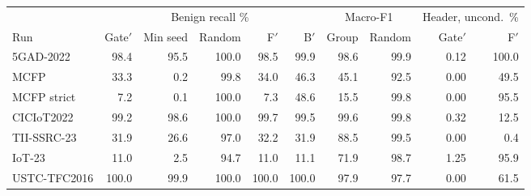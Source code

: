 \begin{tabular}{lrrrrrrrrr}
\toprule
& \multicolumn{5}{c}{Benign recall \%} & \multicolumn{2}{c}{Macro-F1} & \multicolumn{2}{c}{Header, uncond.\ \%} \\ \cmidrule(lr){2-6}\cmidrule(lr){7-8}\cmidrule(lr){9-10}
Run & Gate$'$ & Min seed & Random & F$'$ & B$'$ & Group & Random & Gate$'$ & F$'$ \\
\midrule
5GAD-2022 & 98.4 & 95.5 & 100.0 & 98.5 & 99.9 & 98.6 & 99.9 & 0.12 & 100.0 \\
MCFP & 33.3 & 0.2 & 99.8 & 34.0 & 46.3 & 45.1 & 92.5 & 0.00 & 49.5 \\
MCFP strict & 7.2 & 0.1 & 100.0 & 7.3 & 48.6 & 15.5 & 99.8 & 0.00 & 95.5 \\
CICIoT2022 & 99.2 & 98.6 & 100.0 & 99.7 & 99.5 & 99.6 & 99.8 & 0.32 & 12.5 \\
TII-SSRC-23 & 31.9 & 26.6 & 97.0 & 32.2 & 31.9 & 88.5 & 99.5 & 0.00 & 0.4 \\
IoT-23 & 11.0 & 2.5 & 94.7 & 11.0 & 11.1 & 71.9 & 98.7 & 1.25 & 95.9 \\
USTC-TFC2016 & 100.0 & 99.9 & 100.0 & 100.0 & 100.0 & 97.9 & 97.7 & 0.00 & 61.5 \\
\bottomrule
\end{tabular}
